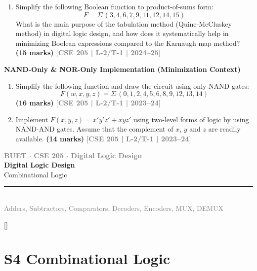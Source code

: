 \documentclass[12pt,a4paper]{article}
\newcommand{\yr}[1]{\hfill\textcolor{gray}{\small\textbf{[#1]}}}
\newcommand{\mk}[1]{\textcolor{orange!70!black}{\small\textbf{(#1 marks)}}}
\newcommand{\subtopic}[2]{%
  \vspace{10pt}
  \noindent\begin{tcolorbox}[colback=#1!8,colframe=#1,boxrule=0.6pt,arc=4pt,
    left=6pt,right=6pt,top=4pt,bottom=4pt]
    \small\bfseries\textcolor{#1}{#2}
  \end{tcolorbox}
  \vspace{2pt}
}
\newcommand{\secdivider}[4]{%
  \newpage\thispagestyle{empty}%
  \vspace*{\fill}%
  \begin{tcolorbox}[enhanced,colback=#4!7,colframe=#3,boxrule=1.5pt,arc=8pt,
    left=20pt,right=20pt,top=22pt,bottom=22pt,
    shadow={3pt}{-3pt}{0pt}{black!15}]
    \centering
    {\large\textcolor{gray}{\textbf{BUET $\cdot$ CSE 205 $\cdot$ Digital Logic Design}}}\\[8pt]
    {\fontsize{26}{32}\selectfont\bfseries\textcolor{#3}{Digital Logic Design}}\\[6pt]
    {\fontsize{15}{19}\selectfont\textcolor{dgray}{#1}}\\[12pt]
    \textcolor{#3!60}{\rule{0.5\textwidth}{0.5pt}}\\[6pt]
    {\small\textcolor{gray}{#2}}
  \end{tcolorbox}%
  \vspace*{\fill}\newpage%
}
\begin{document}
\begin{enumerate}
\item Simplify the following Boolean function to product-of-sums form:
\[ F = \Sigma\,(3,4,6,7,9,11,12,14,15) \]
What is the main purpose of the tabulation method (Quine-McCluskey method) in digital logic design, and how does it systematically help in minimizing Boolean expressions compared to the Karnaugh map method?
\mk{15} \yr{CSE 205 | L-2/T-1 | 2024--25}

\end{enumerate}

\subtopic{cC}{NAND-Only \& NOR-Only Implementation (Minimization Context)}
\label{sub:s3-nand-impl}

\begin{enumerate}

\item Simplify the following function and draw the circuit using only NAND gates:
\[ F(w,x,y,z) = \Sigma\,(0,1,2,4,5,6,8,9,12,13,14) \]
\mk{16} \yr{CSE 205 | L-2/T-1 | 2023--24}

\item Implement $F(x,y,z) = x'y'z' + xyz'$ using two-level forms of logic by using NAND-AND gates. Assume that the complement of $x$, $y$ and $z$ are readily available.
\mk{14} \yr{CSE 205 | L-2/T-1 | 2023--24}

\end{enumerate}


\secdivider{Combinational Logic}{Adders, Subtractors, Comparators, Decoders, Encoders, MUX, DEMUX}{cD}{violet}

\label{sec:S4}
\titleformat{\section}{\large\bfseries\color{cD}}{}{0em}{}[\titlerule]
\section*{S4 \quad Combinational Logic}
\end{document}
